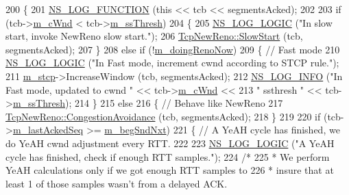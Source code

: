 \begin{DoxyCode}
200 \{
201   \hyperlink{log-macros-disabled_8h_a90b90d5bad1f39cb1b64923ea94c0761}{NS\_LOG\_FUNCTION} (\textcolor{keyword}{this} << tcb << segmentsAcked);
202 
203   \textcolor{keywordflow}{if} (tcb->\hyperlink{classns3_1_1TcpSocketState_a7cd3d2156a483c1db436097477a0fd7f}{m\_cWnd} < tcb->\hyperlink{classns3_1_1TcpSocketState_aec003b6dba9d269bfb1036c7652ffbd6}{m\_ssThresh})
204     \{
205       \hyperlink{group__logging_ga88acd260151caf2db9c0fc84997f45ce}{NS\_LOG\_LOGIC} (\textcolor{stringliteral}{"In slow start, invoke NewReno slow start."});
206       \hyperlink{classns3_1_1TcpNewReno_a1cf5fd9585eb3b745727f4f5beae0706}{TcpNewReno::SlowStart} (tcb, segmentsAcked);
207     \}
208   \textcolor{keywordflow}{else} \textcolor{keywordflow}{if} (!\hyperlink{classns3_1_1TcpYeah_ad70d5e4310bd47c13bdfe5a665a4a911}{m\_doingRenoNow})
209     \{ \textcolor{comment}{// Fast mode}
210       \hyperlink{group__logging_ga88acd260151caf2db9c0fc84997f45ce}{NS\_LOG\_LOGIC} (\textcolor{stringliteral}{"In Fast mode, increment cwnd according to STCP rule."});
211       \hyperlink{classns3_1_1TcpYeah_aa02909129f868dc1b58ade0efa826ff3}{m\_stcp}->IncreaseWindow (tcb, segmentsAcked);
212       \hyperlink{group__logging_gafbd73ee2cf9f26b319f49086d8e860fb}{NS\_LOG\_INFO} (\textcolor{stringliteral}{"In Fast mode, updated to cwnd "} << tcb->\hyperlink{classns3_1_1TcpSocketState_a7cd3d2156a483c1db436097477a0fd7f}{m\_cWnd} <<
213                    \textcolor{stringliteral}{" ssthresh "} << tcb->\hyperlink{classns3_1_1TcpSocketState_aec003b6dba9d269bfb1036c7652ffbd6}{m\_ssThresh});
214     \}
215   \textcolor{keywordflow}{else}
216     \{ \textcolor{comment}{// Behave like NewReno}
217       \hyperlink{classns3_1_1TcpNewReno_a34a5eec0649a7b485852c74c825e14ba}{TcpNewReno::CongestionAvoidance} (tcb, segmentsAcked);
218     \}
219 
220   \textcolor{keywordflow}{if} (tcb->\hyperlink{classns3_1_1TcpSocketState_a7a30ba2b675238429c7fe2f0c8d1ce94}{m\_lastAckedSeq} >= \hyperlink{classns3_1_1TcpYeah_a8e8f91c5e0b2706f00c89d76563e83fb}{m\_begSndNxt})
221     \{ \textcolor{comment}{// A YeAH cycle has finished, we do YeAH cwnd adjustment every RTT.}
222 
223       \hyperlink{group__logging_ga88acd260151caf2db9c0fc84997f45ce}{NS\_LOG\_LOGIC} (\textcolor{stringliteral}{"A YeAH cycle has finished, check if enough RTT samples."});
224       \textcolor{comment}{/*}
225 \textcolor{comment}{       * We perform YeAH calculations only if we got enough RTT samples to}
226 \textcolor{comment}{       * insure that at least 1 of those samples wasn't from a delayed ACK.}

\end{DoxyCode}
